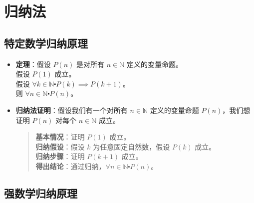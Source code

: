 \section{归纳法}

\subsection{特定数学归纳原理}

\begin{itemize}
    \item \textbf{定理}：假设 $P(n)$ 是对所有 $n \in \mathbb{N}$ 定义的变量命题。\\
          假设 $P(1)$ 成立。\\
          假设 $\forall k \in \mathbb{N} \centerdot P(k) \implies P(k + 1)$。\\
          则 $\forall n \in \mathbb{N} \centerdot P(n)$。
    \item \textbf{归纳法证明}：假设我们有一个对所有 $n \in \mathbb{N}$ 定义的变量命题 $P(n)$，我们想证明 $P(n)$ 对每个 $n \in \mathbb{N}$ 成立。
          \begin{quote}
              \textbf{基本情况}：证明 $P(1)$ 成立。\\
              \textbf{归纳假设}：假设 $k$ 为任意固定自然数，假设 $P(k)$ 成立。\\
              \textbf{归纳步骤}：证明 $P(k + 1)$ 成立。\\
              \textbf{得出结论}：通过归纳，$\forall n \in \mathbb{N} \centerdot P(n)$。
          \end{quote}
\end{itemize}

\subsection{强数学归纳原理}

